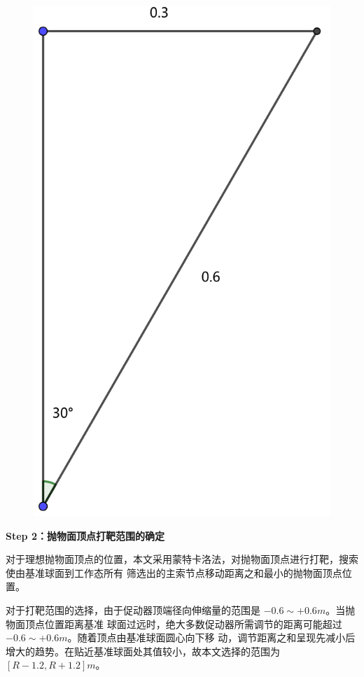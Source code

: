\documentclass[withoutpreface,bwprint]{cumcmthesis} %
\begin{document}
\begin{figure}[!h]
\begin{minipage}[c]{0.48\textwidth}
        \includegraphics[height=0.2\textheight]{angle2.pdf}
    \end{minipage}
    \caption{}
    \label{fig:range}
\end{figure}

\textbf{Step 2：抛物面顶点打靶范围的确定}

对于理想抛物面顶点的位置，本文采用蒙特卡洛法，对抛物面顶点进行打靶，搜索使由基准球面到工作态所有
筛选出的主索节点移动距离之和最小的抛物面顶点位置。

对于打靶范围的选择，由于促动器顶端径向伸缩量的范围是 $-0.6\sim +0.6m$。当抛物面顶点位置距离基准
球面过远时，绝大多数促动器所需调节的距离可能超过 $-0.6\sim +0.6m$。随着顶点由基准球面圆心向下移
动，调节距离之和呈现先减小后增大的趋势。在贴近基准球面处其值较小，故本文选择的范围为$\left[R-1.2,
R+1.2\right]m$。
\end{document}

